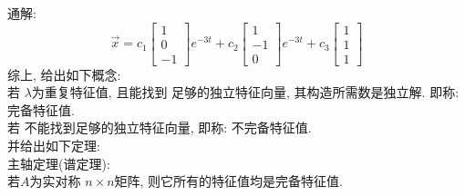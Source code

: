 通解:
\[
\vec{x}
=
c_1
\begin{bmatrix}
    1 \\
    0 \\
    -1
\end{bmatrix}
e^{-3t}
+
c_2
\begin{bmatrix}
    1 \\
    -1 \\
    0
\end{bmatrix}
e^{-3t}
+
c_3
\begin{bmatrix}
    1 \\
    1 \\
    1
\end{bmatrix}
\]
综上, 给出如下概念:\\
若 $\lambda$为重复特征值, 且能找到
足够的独立特征向量, 其构造所需数是独立解.
即称: 完备特征值.\\
若 不能找到足够的独立特征向量, 即称: 不完备特征值.\\[0.2em]
并给出如下定理:\\[0.5em]
主轴定理(谱定理):\\
若$A$为实对称 $n \times n$矩阵, 则它所有的特征值均是完备特征值.


